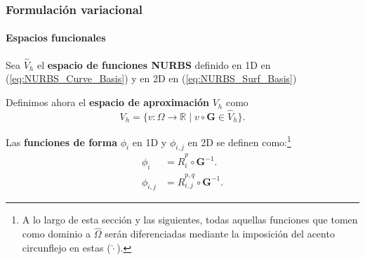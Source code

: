 \documentclass[compress]{beamer}
\begin{document}
\begin{frame}
	\frametitle{Formulación variacional}
	\framesubtitle{Espacios funcionales}
	\scriptsize
	\begin{definition}
		Sea $\hat{V}_h$ el \textbf{espacio de funciones NURBS} definido en 1D en (\ref{eq:NURBS_Curve_Basis}) y en 2D en (\ref{eq:NURBS_Surf_Basis})

		Definimos ahora el \textbf{espacio de aproximación} $V_h$ como
		\begin{equation*}
			V_h = \Big\{ v : \Omega \to \mathbb{R} \mid v \circ \mathbf{G} \in \hat{V}_h \Big\}.
		\end{equation*}
	\end{definition}

	\begin{definition}
		Las \textbf{funciones de forma} $\phi_i$ en 1D y  $\phi_{i,j}$ en 2D se definen como:\footnote{A lo largo de esta sección y las siguientes, todas aquellas funciones que tomen como dominio a $\hat{\Omega}$ serán diferenciadas mediante la imposición del acento circunflejo en estas ($\hat{\cdot}$).} 
		\begin{align*}
			\phi_i &= \hat{R}_i^p \circ \mathbf{G}^{-1}.\\
			\phi_{i,j} &= \hat{R}_{i,j}^{p,q} \circ \mathbf{G}^{-1}.
		\end{align*}
	\end{definition}
\end{frame}
\end{document}
